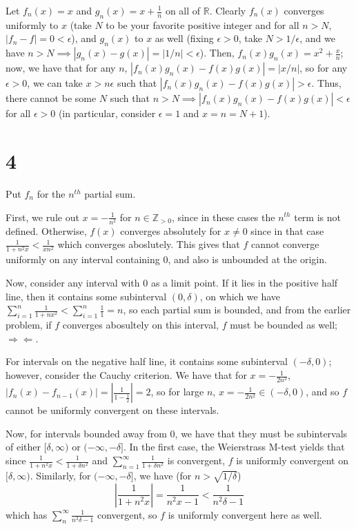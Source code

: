 \documentclass[12pt,letterpaper]{article}
\theoremstyle{definition}
\newcommand{\contra}{\Rightarrow\!\Leftarrow}
\newcommand{\R}{\mathbb{R}}
\newcommand{\Z}{\mathbb{Z}}
\begin{document}
Let $f_{n}(x) = x$ and $g_{n}(x) = x + \frac{1}{n}$ on all of $\R$. Clearly $f_{n}(x)$ converges uniformly to $x$ (take $N$ to be your favorite positive integer and for all $n > N$, $|f_{n} - f| = 0 < \epsilon$), and $g_{n}(x)$ to $x$ as well (fixing $\epsilon > 0$, take $N > 1/\epsilon$, and we have $n > N \implies |g_{n}(x) - g(x)| = |1/n| < \epsilon$). Then, $f_{n}(x)g_{n}(x) = x^{2} + \frac{x}{n}$; now, we have that for any $n$, $|f_{n}(x)g_{n}(x) - f(x)g(x)| = |x/n|$, so for any $\epsilon > 0$, we can take $x > n\epsilon$ such that $|f_{n}(x)g_{n}(x) - f(x)g(x)| > \epsilon$. Thus, there cannot be some $N$ such that $n > N \implies |f_{n}(x)g_{n}(x) - f(x)g(x)| < \epsilon$ for all $\epsilon > 0$ (in particular, consider $\epsilon = 1$ and $x = n = N + 1$).

\section*{4}

Put $f_{n}$ for the $n^{th}$ partial sum.

First, we rule out $x = -\frac{1}{n^{2}}$ for $n \in \Z_{> 0}$, since in these cases the $n^{th}$ term is not defined. Otherwise, $f(x)$ converges absolutely for $x \neq 0$ since in that case $\frac{1}{1+n^{2}x} < \frac{1}{xn^{2}}$ which converges aboslutely. This gives that $f$ cannot converge uniformly on any interval containing 0, and also is unbounded at the origin.

Now, consider any interval with 0 as a limit point. If it lies in the positive half line, then it contains some subinterval $(0, \delta)$, on which we have $\sum_{i=1}^{n}\frac{1}{1+nx^{2}} < \sum_{i=1}^{n}\frac{1}{1} = n$, so each partial sum is bounded, and from the earlier problem, if $f$ converges abosultely on this interval, $f$ must be bounded as well; $\contra$.

For intervals on the negative half line, it contains some subinterval $(-\delta, 0)$; however, consider the Cauchy criterion. We have that for $x = -\frac{1}{2n^{2}}$, $|f_{n}(x) - f_{n-1}(x)| = |\frac{1}{1-\frac{1}{2}}| = 2$, so for large $n$, $x = -\frac{1}{2n^{2}} \in (-\delta, 0)$, and so $f$ cannot be uniformly convergent on these intervals.

Now, for intervals bounded away from 0, we have that they must be subintervals of either $[\delta, \infty)$ or $(-\infty, -\delta]$. In the first case, the Weierstrass M-test yields that since $\frac{1}{1+n^{2}x} < \frac{1}{1+\delta n^{2}}$ and $\sum_{n=1}^{\infty}\frac{1}{1+\delta n^{2}}$ is convergent, $f$ is uniformly convergent on $[\delta, \infty)$. Similarly, for $(-\infty, -\delta]$, we have (for $n > \sqrt{1/\delta}$)
\[
  \left|\frac{1}{1 + n^{2}x}\right| = \frac{1}{n^{2}x - 1} < \frac{1}{n^{2}\delta - 1}
\]
which has $\sum_{n}^{\infty}\frac{1}{n^{2}\delta - 1}$ convergent, so $f$ is uniformly convergent here as well.
\end{document}
